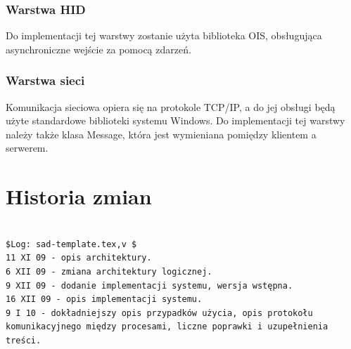 \documentclass[12pt,a4paper,twoside]{article}
\begin{document}
\subsubsection{Warstwa HID}

Do implementacji tej warstwy zostanie użyta biblioteka OIS, obsługująca asynchroniczne wejście za pomocą zdarzeń. 

\subsubsection{Warstwa sieci}

Komunikacja sieciowa opiera się na protokole TCP/IP, a do jej obsługi będą użyte standardowe biblioteki systemu Windows. Do implementacji tej warstwy należy także klasa Message, która jest wymieniana pomiędzy klientem a serwerem.







\section{Historia zmian}

\begin{verbatim}

$Log: sad-template.tex,v $
11 XI 09 - opis architektury.
6 XII 09 - zmiana architektury logicznej.
9 XII 09 - dodanie implementacji systemu, wersja wstępna.
16 XII 09 - opis implementacji systemu.
9 I 10 - dokładniejszy opis przypadków użycia, opis protokołu komunikacyjnego między procesami, liczne poprawki i uzupełnienia treści.

\end{verbatim}
\end{document}
